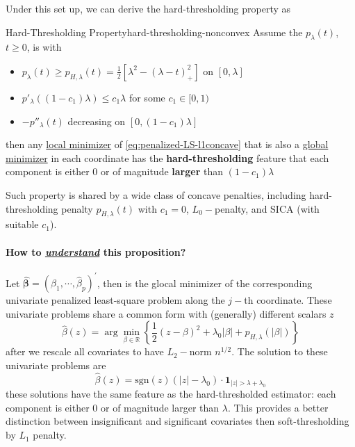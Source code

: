 \documentclass[twoside]{article}
\begin{document}
Under this set up, we can derive the hard-thresholding property as 
\begin{proposition}{Hard-Thresholding Property}{hard-thresholding-nonconvex}
    Assume the $p_{\lambda}(t)$, $t\geq 0$, is  with 
    \begin{itemize}
        \item $p_{\lambda}(t)\geq p_{H,\lambda}(t) = \frac{1}{2}\left[\lambda^2-(\lambda-t)^2_+\right]$ on $[0,\lambda]$
        \item $p'_{\lambda}\left((1-c_1)\lambda\right)\leq c_1\lambda$ for some $c_1\in [0,1)$
        \item $-p''_{\lambda}(t)$ decreasing on $[0,(1-c_1)\lambda]$
    \end{itemize}
    then any \underline{local minimizer} of \ref{eq:penalized-LS-l1concave} that is also a \underline{global minimizer} in each coordinate has the \textbf{{hard-thresholding}} feature that each component is either $0$ or of magnitude \textbf{larger} than $(1-c_1)\lambda$
\end{proposition}
Such property is shared by a wide class of concave penalties, including hard-thresholding penalty $p_{H,\lambda}(t)$ with $c_1=0$, $L_0-$penalty, and SICA (with suitable $c_1$).

\paragraph*{How to \textit{\underline{understand}} this proposition?} Let $\hat{\boldsymbol{\beta}}=\left(\hat{\beta}_1,\cdots,\hat{\beta}_p\right)^{\prime}$, then  is the glocal minimizer of the corresponding univariate penalized least-square problem along the $j-$th coordinate. These univariate problems share a common form with (generally) different scalars $z$ $$ \hat{\beta}(z) = \arg\min_{\beta\in\mathbb{R}}\left\{ \frac{1}{2}(z-\beta)^2 + \lambda_0\lvert\beta\rvert + p_{H,\lambda}(\lvert \beta \rvert) \right\} $$
after we rescale all covariates to have $L_2-$norm $n^{1/2}$. The solution to these univariate problems are $$ \hat{\beta}(z) = \mathrm{sgn}(z)(\lvert z \rvert-\lambda_0)\cdot\mathbf{1}_{\lvert z\rvert > \lambda+\lambda_0} $$
these solutions have the same feature as the hard-thresholded estimator: each component is either 0 or of magnitude larger than $\lambda$. This provides a better distinction between insignificant and significant covariates then soft-thresholding by $L_1$ penalty.
\end{document}
